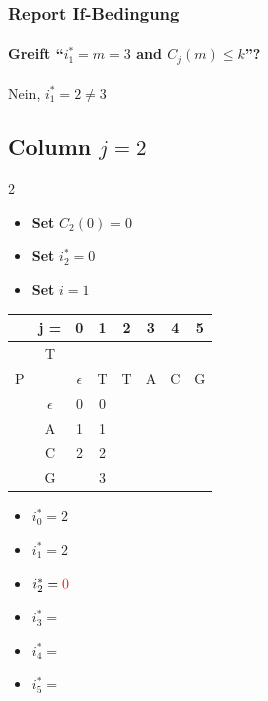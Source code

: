 \subsubsection*{Report If-Bedingung}

\paragraph{Greift ``$i^*_1 = m = 3$ and $C_j(m) \leq k$''?} Nein, $i^*_1 = 2 \neq 3$

\newpage

\subsection*{Column $j = 2$}

\begin{multicols}{2}

    \begin{itemize}
        \item \textbf{Set} $C_2(0) = 0$
        \item \textbf{Set} $i_2^\ast = 0$
        \item \textbf{Set} $i = 1$
    \end{itemize}
    \begin{center}
        \begin{tabular}{|c c|c|c|c|c|c|c|} \hline
        &   j =     &  0            &   1   &   2   &   3   &   4   &   5   \\ \hline
        &   T       &               &       &       &       &       &       \\
        P   &       &  $\epsilon$   &   T   &   T   &   A   &   C   &   G   \\ \hline
        & $\epsilon$&       0       &0      &  \ccr0    &       &       &       \\ \hline
        &    A      &       1       &   1   &       &       &       &       \\ \hline
        &    C      &   2           &   2   &       &       &       &       \\ \hline
        &    G      &               &3      &       &       &       &       \\ \hline
        \end{tabular}
    \end{center}
    \columnbreak
    \begin{itemize}
        \item $i_0^\ast = 2$
        \item $i_1^\ast = 2 $
        \item $i_2^\ast = \textcolor{red}{0}$
        \item $i_3^\ast = $
        \item $i_4^\ast = $
        \item $i_5^\ast = $
    \end{itemize}
\end{multicols}

